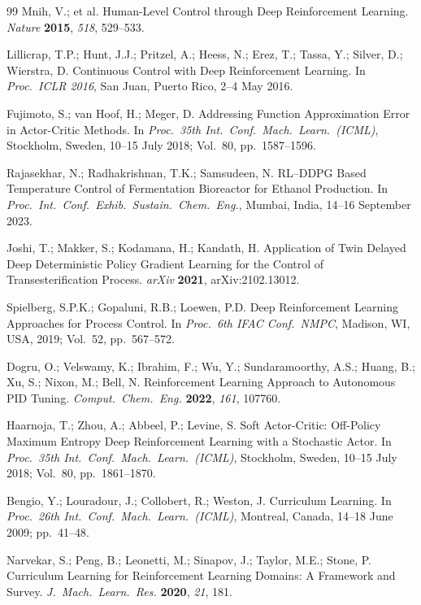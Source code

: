 \documentclass[processes,article,submit,moreauthors,pdftex]{Definitions/mdpi}
\begin{document}
\begin{thebibliography}{99}
Mnih, V.; et al.
Human-Level Control through Deep Reinforcement Learning.
\textit{Nature} \textbf{2015}, \textit{518}, 529--533.

Lillicrap, T.P.; Hunt, J.J.; Pritzel, A.; Heess, N.; Erez, T.; Tassa, Y.;
Silver, D.; Wierstra, D.
Continuous Control with Deep Reinforcement Learning.
In \textit{Proc.\ ICLR 2016}, San Juan, Puerto Rico, 2--4 May 2016.

Fujimoto, S.; van Hoof, H.; Meger, D.
Addressing Function Approximation Error in Actor-Critic Methods.
In \textit{Proc.\ 35th Int.\ Conf.\ Mach.\ Learn.\ (ICML)},
Stockholm, Sweden, 10--15 July 2018; Vol.~80, pp.~1587--1596.

Rajasekhar, N.; Radhakrishnan, T.K.; Samsudeen, N.
RL--DDPG Based Temperature Control of Fermentation Bioreactor for Ethanol
Production.
In \textit{Proc.\ Int.\ Conf.\ Exhib.\ Sustain.\ Chem.\ Eng.},
Mumbai, India, 14--16 September 2023.

Joshi, T.; Makker, S.; Kodamana, H.; Kandath, H.
Application of Twin Delayed Deep Deterministic Policy Gradient Learning for
the Control of Transesterification Process.
\textit{arXiv} \textbf{2021}, arXiv:2102.13012.

Spielberg, S.P.K.; Gopaluni, R.B.; Loewen, P.D.
Deep Reinforcement Learning Approaches for Process Control.
In \textit{Proc.\ 6th IFAC Conf.\ NMPC}, Madison, WI, USA, 2019;
Vol.~52, pp.~567--572.

Dogru, O.; Velswamy, K.; Ibrahim, F.; Wu, Y.; Sundaramoorthy, A.S.;
Huang, B.; Xu, S.; Nixon, M.; Bell, N.
Reinforcement Learning Approach to Autonomous PID Tuning.
\textit{Comput.\ Chem.\ Eng.} \textbf{2022}, \textit{161}, 107760.

Haarnoja, T.; Zhou, A.; Abbeel, P.; Levine, S.
Soft Actor-Critic: Off-Policy Maximum Entropy Deep Reinforcement Learning
with a Stochastic Actor.
In \textit{Proc.\ 35th Int.\ Conf.\ Mach.\ Learn.\ (ICML)},
Stockholm, Sweden, 10--15 July 2018; Vol.~80, pp.~1861--1870.

Bengio, Y.; Louradour, J.; Collobert, R.; Weston, J.
Curriculum Learning.
In \textit{Proc.\ 26th Int.\ Conf.\ Mach.\ Learn.\ (ICML)},
Montreal, Canada, 14--18 June 2009; pp.~41--48.

Narvekar, S.; Peng, B.; Leonetti, M.; Sinapov, J.; Taylor, M.E.; Stone, P.
Curriculum Learning for Reinforcement Learning Domains: A Framework
and Survey.
\textit{J.\ Mach.\ Learn.\ Res.} \textbf{2020}, \textit{21}, 181.


\end{thebibliography}
\end{document}
